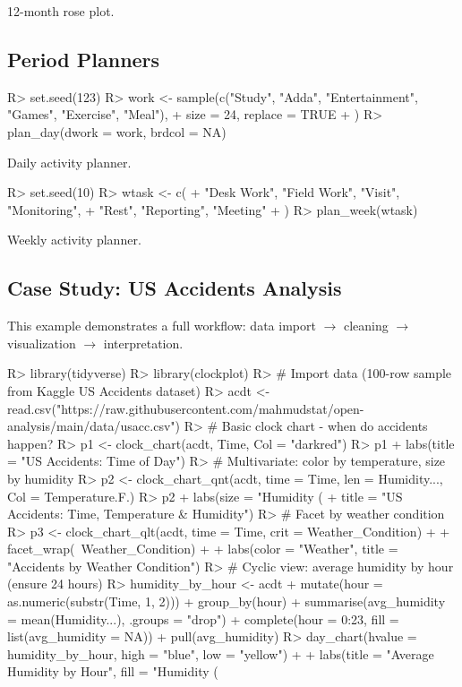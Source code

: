 \documentclass[article]{jss}
\begin{document}
12-month rose plot.

\subsection{Period Planners}

\begin{Schunk}
\begin{Sinput}
R> set.seed(123)
R> work <- sample(c("Study", "Adda", "Entertainment", "Games", "Exercise", "Meal"),
+    size = 24, replace = TRUE
+  )
R> plan_day(dwork = work, brdcol = NA)
\end{Sinput}
\end{Schunk}

Daily activity planner.

\begin{Schunk}
\begin{Sinput}
R> set.seed(10)
R> wtask <- c(
+    "Desk Work", "Field Work", "Visit", "Monitoring",
+    "Rest", "Reporting", "Meeting"
+  )
R> plan_week(wtask)
\end{Sinput}
\end{Schunk}

Weekly activity planner.

\subsection{Case Study: US Accidents Analysis}

This example demonstrates a full workflow: data import $\to$ cleaning $\to$ visualization $\to$ interpretation.

\begin{Schunk}
\begin{Sinput}
R> library(tidyverse)
R> library(clockplot)
R> # Import data (100-row sample from Kaggle US Accidents dataset)
R> acdt <- read.csv("https://raw.githubusercontent.com/mahmudstat/open-analysis/main/data/usacc.csv")
R> # Basic clock chart - when do accidents happen?
R> p1 <- clock_chart(acdt, Time, Col = "darkred")
R> p1 + labs(title = "US Accidents: Time of Day")
R> # Multivariate: color by temperature, size by humidity
R> p2 <- clock_chart_qnt(acdt, time = Time, len = Humidity..., Col = Temperature.F.)
R> p2 + labs(size = "Humidity (%
+         title = "US Accidents: Time, Temperature & Humidity")
R> # Facet by weather condition
R> p3 <- clock_chart_qlt(acdt, time = Time, crit = Weather_Condition) +
+    facet_wrap(~Weather_Condition) +
+    labs(color = "Weather", title = "Accidents by Weather Condition")
R> # Cyclic view: average humidity by hour (ensure 24 hours)
R> humidity_by_hour <- acdt %
+    mutate(hour = as.numeric(substr(Time, 1, 2))) %
+    group_by(hour) %
+    summarise(avg_humidity = mean(Humidity...), .groups = "drop") %
+    complete(hour = 0:23, fill = list(avg_humidity = NA)) %
+    pull(avg_humidity)
R> day_chart(hvalue = humidity_by_hour, high = "blue", low = "yellow") +
+    labs(title = "Average Humidity by Hour", fill = "Humidity (%
\end{Sinput}
\end{Schunk}
\end{document}
